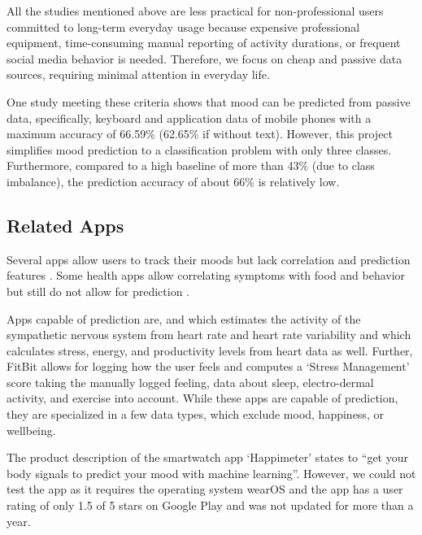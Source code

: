 \documentclass[conference]{IEEEtran}
\begin{document}
All the studies mentioned above are less practical for non-professional users committed to long-term everyday usage because expensive professional equipment, time-consuming manual reporting of activity durations, or frequent social media behavior is needed.
Therefore, we focus on cheap and passive data sources, requiring minimal attention in everyday life.

One study meeting these criteria shows that mood can be predicted from passive data, specifically, keyboard and application data of mobile phones with a maximum accuracy of 66.59\% (62.65\% if without text)\cite{liu_multimodal_2020}. However, this project simplifies mood prediction to a classification problem with only three classes. Furthermore, compared to a high baseline of more than 43\% (due to class imbalance), the prediction accuracy of about 66\% is relatively low.\\


\subsection{Related Apps}
\label{sec:apps}

Several apps allow users to track their moods but lack correlation and prediction features  \cite{noauthor_moodprism_nodate}\cite{noauthor_moodily_nodate} \cite{noauthor_moodpanda_nodate}\cite{noauthor_daylio_nodate} \cite{noauthor_mood_nodate}\cite{noauthor_mood_nodate-1}\cite{appleinc_ios_nodate}\cite{hellocodeinc_exist_nodate}.
Some health apps allow correlating symptoms with food and behavior but still do not allow for prediction \cite{noauthor_pattern_nodate}\cite{noauthor_features_nodate}.

Apps capable of prediction are, and \cite{elitehrv_best_nodate} which estimates the activity of the sympathetic nervous system from heart rate and heart rate variability and \cite{welltory_welltory_nodate} which calculates stress, energy, and productivity levels from heart data as well\cite{welltory_welltory_nodate}.
Further, FitBit allows for logging how the user feels and computes a `Stress Management' score taking the manually logged feeling, data about sleep, electro-dermal activity, and exercise into account\cite{fitbit_stress_nodate}.
While these apps are capable of prediction, they are specialized in a few data types, which exclude mood, happiness, or wellbeing.

The product description of the smartwatch app `Happimeter' states to ``get your body signals to predict your mood with machine learning''\cite{noauthor_happimeter_nodate}. However, we could not test the app as it requires the operating system wearOS and the app has a user rating of only 1.5 of 5 stars on Google Play and was not updated for more than a year\cite{noauthor_happimeter_nodate}.
\end{document}
